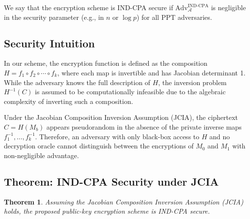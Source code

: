 \documentclass[12pt]{article}
\newtheorem{theorem}{Theorem}
\begin{document}
We say that the encryption scheme is IND-CPA secure if \( \text{Adv}_{\mathcal{A}}^{\text{IND-CPA}} \) is negligible in the security parameter (e.g., in \( n \) or \( \log p \)) for all PPT adversaries.

\subsection*{Security Intuition}

In our scheme, the encryption function is defined as the composition \( H = f_1 \circ f_2 \circ \cdots \circ f_k \), where each map is invertible and has Jacobian determinant 1. While the adversary knows the full description of \( H \), the inversion problem \( H^{-1}(C) \) is assumed to be computationally infeasible due to the algebraic complexity of inverting such a composition.

Under the Jacobian Composition Inversion Assumption (JCIA), the ciphertext \( C = H(M_b) \) appears pseudorandom in the absence of the private inverse maps \( f_1^{-1}, \dots, f_k^{-1} \). Therefore, an adversary with only black-box access to \( H \) and no decryption oracle cannot distinguish between the encryptions of \( M_0 \) and \( M_1 \) with non-negligible advantage.

\subsection*{Theorem: IND-CPA Security under JCIA}

\begin{theorem}
Assuming the Jacobian Composition Inversion Assumption (JCIA) holds, the proposed public-key encryption scheme is IND-CPA secure.
\end{theorem}
\end{document}
